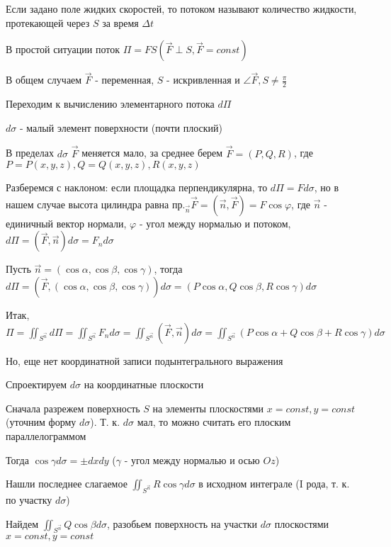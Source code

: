 \documentclass[12pt]{article}
\begin{document}
\begin{enumerate}[label*=\textbf{\arabic** }]
    Если задано поле жидких скоростей, то потоком называют количество жидкости, протекающей через $S$ за время $\Delta t$

    В простой ситуации поток $\Pi = FS (\overrightarrow{F} \perp S, \overrightarrow{F} = const)$

    В общем случаем $\overrightarrow{F}$ - переменная, $S$ - искривленная и $\angle \overrightarrow{F}, S \neq \frac{\pi}{2}$

    Переходим к вычислению элементарного потока $d\Pi$

    $d\sigma$ - малый элемент поверхности (почти плоский)

    В пределах $d\sigma$ $\overrightarrow{F}$ меняется мало, за среднее берем $\overrightarrow{F} = (P, Q, R)$, где $P = P(x, y, z), Q = Q(x, y, z), R(x, y, z)$

    Разберемся с наклоном: если площадка перпендикулярна, то $d\Pi = F d\sigma$,
    но в нашем случае высота цилиндра равна $\text{пр.}_{\overrightarrow{n}} \overrightarrow{F} = (\overrightarrow{n}, \overrightarrow{F}) = F \cos\varphi$, где $\overrightarrow{n}$ - единичный вектор нормали, $\varphi$ - угол между нормалью и потоком,
    $d\Pi = (\overrightarrow{F}, \overrightarrow{n}) d\sigma = F_n d\sigma$

    Пусть $\overrightarrow{n} = (\cos\alpha, \cos\beta, \cos\gamma)$, тогда $d\Pi = (\overrightarrow{F}, (\cos\alpha, \cos\beta, \cos\gamma)) d\sigma =
    (P\cos\alpha, Q\cos\beta, R\cos\gamma)d\sigma$

    Итак, $\Pi = \iint_{S^{\overrightarrow{n}}} d\Pi = \iint_{S^{\overrightarrow{n}}} F_n d\sigma = \iint_{S^{\overrightarrow{n}}} (\overrightarrow{F}, \overrightarrow{n})d\sigma = \iint_{S^{\overrightarrow{n}}} (P\cos\alpha + Q\cos\beta + R\cos\gamma)d\sigma$

    Но, еще нет координатной записи подынтегрального выражения

    Спроектируем $d\sigma$ на координатные плоскости

    Сначала разрежем поверхность $S$ на элементы плоскостями $x = const, y = const$ (уточним форму $d\sigma$). Т. к. $d\sigma$ мал, то можно считать его плоским параллелограммом

    Тогда $\cos\gamma d\sigma = \pm dxdy$ ($\gamma$ - угол между нормалью и осью $Oz$)

    Нашли последнее слагаемое $\iint_{S^{\overrightarrow{n}}} R\cos\gamma d\sigma$ в исходном интеграле (I рода, т. к. по участку $d\sigma$)

    Найдем $\iint_{S^{\overrightarrow{n}}} Q\cos\beta d\sigma$, разобьем поверхность на участки $d\sigma$ плоскостями $x = const, y = const$


\end{enumerate}
\end{document}
